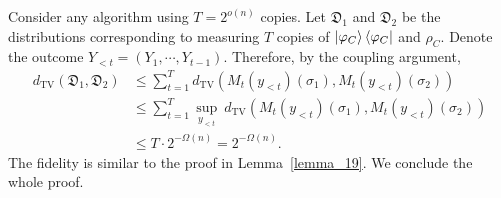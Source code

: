 Consider any algorithm using $T=2^{o(n)}$ copies.
Let $\mathfrak{D}_1$ and $\mathfrak{D}_2$ be the distributions corresponding to measuring $T$ copies of $\ket{\varphi_C}\bra{\varphi_C}$ and $\rho_C$.
Denote the outcome $Y_{<t}=(Y_1,\cdots,Y_{t-1})$.
Therefore, by the coupling argument,
\begin{align*}
d_{\mathrm{TV}}\left(\mathfrak{D}_1,\mathfrak{D}_2\right)&\le\sum_{t=1}^Td_{\mathrm{TV}}\left(M_t(y_{<t})(\sigma_1),M_t(y_{<t})(\sigma_2)\right)\\
&\le\sum_{t=1}^T\sup_{y_{<t}}\ d_{\mathrm{TV}}\left(M_t(y_{<t})(\sigma_1),M_t(y_{<t})(\sigma_2)\right)\\
&\le T\cdot2^{-\Omega(n)}=2^{-\Omega(n)}.
\end{align*}
The fidelity is similar to the proof in Lemma~\ref{lemma_19}.
We conclude the whole proof.

